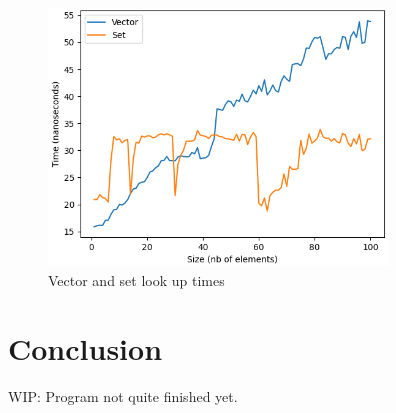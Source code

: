 \documentclass[conference]{IEEEtran} \IEEEoverridecommandlockouts
\begin{document}
\begin{figure}[!h]
	\includegraphics[width=9cm]{Diagram/lookup.png}
	\caption{Vector and set look up times}
	\label{vector vs set lookup}
\end{figure}

\section{Conclusion}

WIP: Program not quite finished yet.

 
\end{document}
